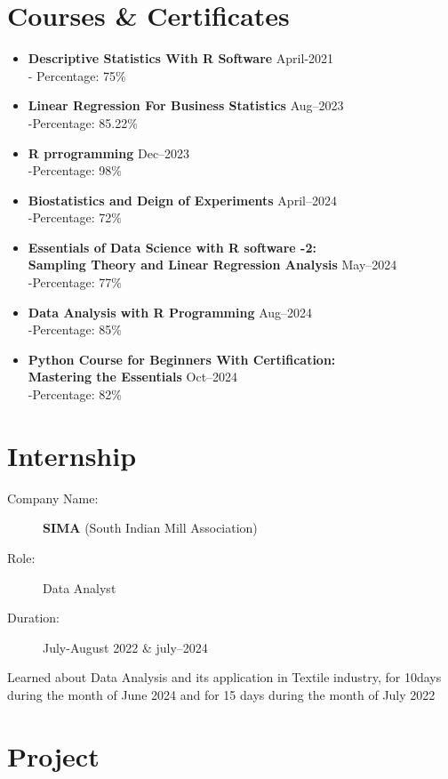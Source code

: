 \documentclass[a4paper,11pt]{article}
\begin{document}
	\section*{Courses \& Certificates}
	\noindent
	\begin{itemize}
		\item \textbf{Descriptive Statistics With R Software } \hfill April-2021\\
		- Percentage: 75\%
		\item \textbf{Linear Regression For Business Statistics} \hfill Aug--2023\\
		-Percentage: 85.22\%
		\item \textbf{R prrogramming } \hfill Dec--2023\\
		-Percentage: 98\%
		\item \textbf{Biostatistics and Deign of Experiments} \hfill April--2024 \\
		-Percentage: 72\%
		\item \textbf{Essentials of Data Science with R software -2:\\
			Sampling Theory and Linear Regression Analysis} \hfill May--2024 \\
			-Percentage: 77\%
		\item \textbf{Data Analysis with R Programming} \hfill Aug--2024 \\
		-Percentage: 85\%
		\item \textbf{Python Course for Beginners With Certification:\\ Mastering the Essentials} \hfill Oct--2024 \\
		-Percentage: 82\%
		
	\end{itemize}
	
	
		\section*{Internship}
	\begin{description}
		\item[Company Name:] \textbf{SIMA} (South Indian Mill Association)
		\item[Role:] Data Analyst
		\item[Duration:] July-August 2022 \& july--2024
	\end{description}
	Learned about Data Analysis and its application in Textile industry, for 10days during 
	the month of June 2024 and for 15 days during the month of July 2022
	\newpage
	\section*{Project}
	
\end{document}
